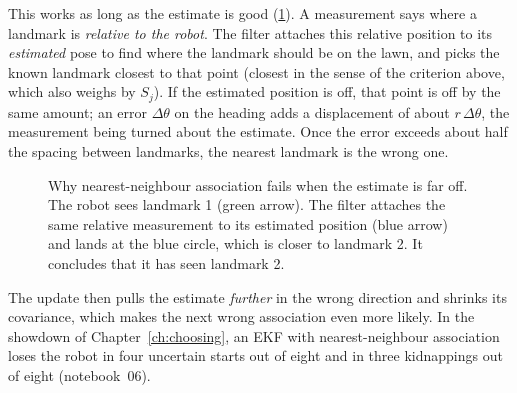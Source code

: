 This works as long as the estimate is good (\cref{fig:nnfail}). A
measurement says where a landmark is \emph{relative to the robot}. The
filter attaches this relative position to its \emph{estimated} pose to
find where the landmark should be on the lawn, and picks the known
landmark closest to that point (closest in the sense of the criterion
above, which also weighs by $S_j$). If the estimated position is off, that
point is off by the same amount; an error $\Delta\theta$ on the heading
adds a displacement of about $r\,\Delta\theta$, the measurement being
turned about the estimate. Once the error exceeds about half the spacing
between landmarks, the nearest landmark is the wrong one.

\begin{figure}[ht]
\centering
{}
\caption{Why nearest-neighbour association fails when the estimate is far
off. The robot sees landmark 1 (green arrow). The filter attaches the same
relative measurement to its estimated position (blue arrow) and lands at
the blue circle, which is closer to landmark 2. It concludes that it has
seen landmark 2.}
\label{fig:nnfail}
\end{figure}
 The update then pulls the estimate \emph{further} in the wrong
direction and shrinks its covariance, which makes the next wrong
association even more likely. In the showdown of Chapter~\ref{ch:choosing}, an EKF with
nearest-neighbour association loses the robot in four uncertain starts
out of eight and in three kidnappings out of eight (notebook~06).

